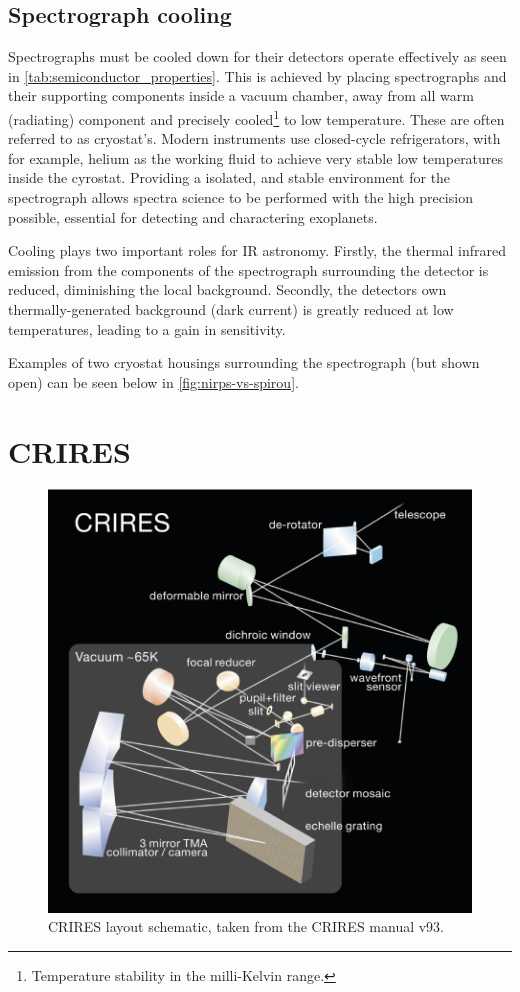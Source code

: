 \subsection{Spectrograph cooling}
\label{subsec:cold_spectrogrpah}
Spectrographs must be cooled down for their detectors operate effectively as seen in \cref{tab:semiconductor_properties}.
This is achieved by placing spectrographs and their supporting components inside a vacuum chamber, away from all warm (radiating) component and precisely cooled\footnote{Temperature stability in the milli-Kelvin range.} to low temperature.
These are often referred to as cryostat's.
Modern instruments use closed-cycle refrigerators, with for example, helium as the working fluid to achieve very stable low temperatures inside the cyrostat.
Providing a isolated, and stable environment for the spectrograph allows spectra science to be performed with the high precision possible, essential for detecting and charactering exoplanets.

Cooling plays two important roles for {IR} astronomy.
Firstly, the thermal infrared emission from the components of the spectrograph surrounding the detector is reduced, diminishing the local background.
Secondly, the detectors own thermally-generated background (dark current) is greatly reduced at low temperatures, leading to a gain in sensitivity.

Examples of two cryostat housings surrounding the spectrograph (but shown open) can be seen below in \cref{fig:nirps-vs-spirou}.


\section{CRIRES}
\label{sec:CRIRES}

\begin{figure}
    \centering
    \includegraphics[width=0.5\linewidth]{figures/spectroscopy/CRIRES_schematic.pdf}
    \caption[CRIRES layout schematic.]{CRIRES layout schematic, taken from the {CRIRES} manual v93.}
    \label{fig:criresschematic}
\end{figure}

